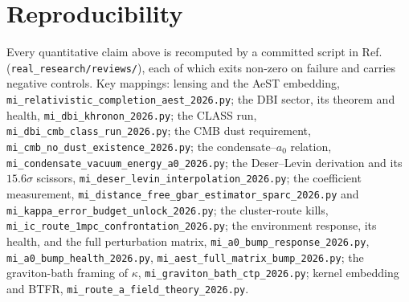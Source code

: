 \documentclass[aps,prd,twocolumn,10pt,nofootinbib,superscriptaddress]{revtex4-2}
\begin{document}
\appendix

\section{Reproducibility}
\label{app:repro}

Every quantitative claim above is recomputed by a committed script in Ref.~\cite{repo}
(\texttt{real\_research/reviews/}), each of which exits non-zero on failure and carries negative
controls. Key mappings: lensing and the AeST embedding,
\texttt{mi\_relativistic\_completion\_aest\_2026.py}; the DBI sector, its theorem and health,
\texttt{mi\_dbi\_khronon\_2026.py}; the CLASS run, \texttt{mi\_dbi\_cmb\_class\_run\_2026.py}; the
CMB dust requirement, \texttt{mi\_cmb\_no\_dust\_existence\_2026.py}; the condensate--$a_0$
relation, \texttt{mi\_condensate\_vacuum\_energy\_a0\_2026.py}; the Deser--Levin derivation and its
$15.6\sigma$ scissors, \texttt{mi\_deser\_levin\_interpolation\_2026.py}; the coefficient
measurement, \texttt{mi\_distance\_free\_gbar\_estimator\_sparc\_2026.py} and
\texttt{mi\_kappa\_error\_budget\_unlock\_2026.py}; the cluster-route kills,
\texttt{mi\_ic\_route\_1mpc\_confrontation\_2026.py}; the environment response, its health, and the
full perturbation matrix, \texttt{mi\_a0\_bump\_response\_2026.py},
\texttt{mi\_a0\_bump\_health\_2026.py}, \texttt{mi\_aest\_full\_matrix\_bump\_2026.py}; the
graviton-bath framing of $\kappa$, \texttt{mi\_graviton\_bath\_ctp\_2026.py}; kernel embedding and
BTFR, \texttt{mi\_route\_a\_field\_theory\_2026.py}.
\end{document}
